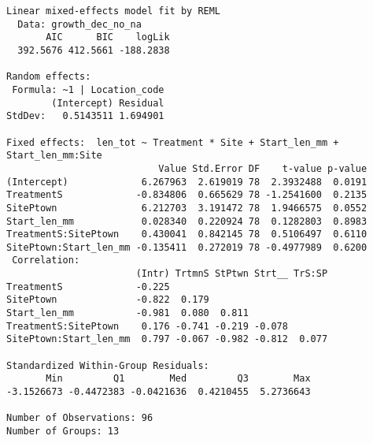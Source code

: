 \documentclass[
  letterpaper,
  DIV=11,
  numbers=noendperiod]{scrartcl}
\newenvironment{Shaded}{\begin{snugshade}}{\end{snugshade}}
\newcommand{\AttributeTok}[1]{\textcolor[rgb]{0.40,0.45,0.13}{#1}}
\newcommand{\CommentTok}[1]{\textcolor[rgb]{0.37,0.37,0.37}{#1}}
\newcommand{\DecValTok}[1]{\textcolor[rgb]{0.68,0.00,0.00}{#1}}
\newcommand{\FunctionTok}[1]{\textcolor[rgb]{0.28,0.35,0.67}{#1}}
\newcommand{\NormalTok}[1]{\textcolor[rgb]{0.00,0.23,0.31}{#1}}
\newcommand{\OtherTok}[1]{\textcolor[rgb]{0.00,0.23,0.31}{#1}}
\newcommand{\SpecialCharTok}[1]{\textcolor[rgb]{0.37,0.37,0.37}{#1}}
\begin{document}
\begin{Shaded}
\end{Shaded}

\begin{verbatim}
Linear mixed-effects model fit by REML
  Data: growth_dec_no_na 
       AIC      BIC    logLik
  392.5676 412.5661 -188.2838

Random effects:
 Formula: ~1 | Location_code
        (Intercept) Residual
StdDev:   0.5143511 1.694901

Fixed effects:  len_tot ~ Treatment * Site + Start_len_mm + Start_len_mm:Site 
                           Value Std.Error DF    t-value p-value
(Intercept)             6.267963  2.619019 78  2.3932488  0.0191
TreatmentS             -0.834806  0.665629 78 -1.2541600  0.2135
SitePtown               6.212703  3.191472 78  1.9466575  0.0552
Start_len_mm            0.028340  0.220924 78  0.1282803  0.8983
TreatmentS:SitePtown    0.430041  0.842145 78  0.5106497  0.6110
SitePtown:Start_len_mm -0.135411  0.272019 78 -0.4977989  0.6200
 Correlation: 
                       (Intr) TrtmnS StPtwn Strt__ TrS:SP
TreatmentS             -0.225                            
SitePtown              -0.822  0.179                     
Start_len_mm           -0.981  0.080  0.811              
TreatmentS:SitePtown    0.176 -0.741 -0.219 -0.078       
SitePtown:Start_len_mm  0.797 -0.067 -0.982 -0.812  0.077

Standardized Within-Group Residuals:
       Min         Q1        Med         Q3        Max 
-3.1526673 -0.4472383 -0.0421636  0.4210455  5.2736643 

Number of Observations: 96
Number of Groups: 13 
\end{verbatim}
\end{document}
